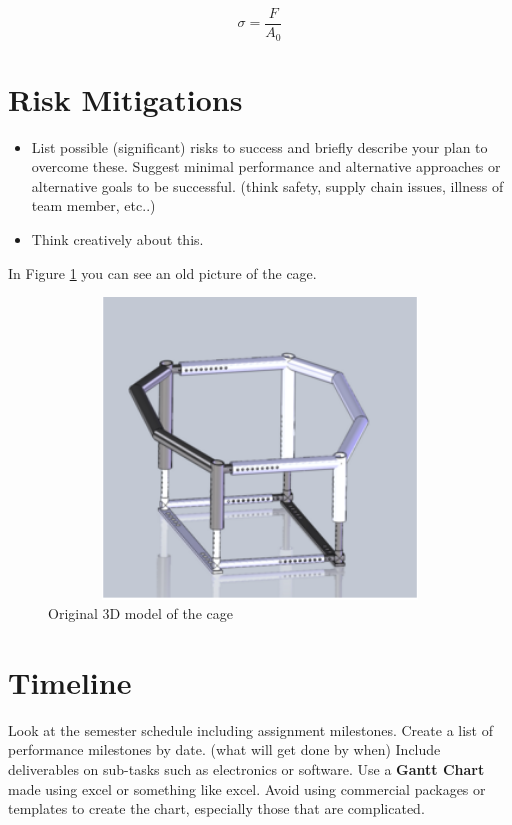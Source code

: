 \documentclass[12pt]{article}
\begin{document}
\begin{equation}
    \sigma = \frac{F}{A_{0}}
    \label{eq:Strain}
\end{equation}

\newpage
\section{Risk Mitigations}
\begin{itemize}
    \item List possible (significant) risks to success and briefly describe your plan to overcome these. Suggest minimal performance and alternative approaches or alternative goals to be successful. (think safety, supply chain issues, illness of team member, etc..)
    \item Think creatively about this.
\end{itemize}

In Figure \ref{fig:cage} you can see an old picture of the cage. 
\begin{figure}[H]
\centering
    \includegraphics[width=12cm,height=8cm]{figure2}
    \caption{Original 3D model of the cage}
    \label{fig:cage}
\end{figure}

\newpage
\section{Timeline}
Look at the semester schedule including assignment milestones. Create a list of performance milestones by date. (what will get done by when) Include deliverables on sub-tasks such as electronics or software.  Use a \textbf{Gantt Chart} made using excel or something like excel.  Avoid using commercial packages or templates to create the chart, especially those that are complicated.
\end{document}
